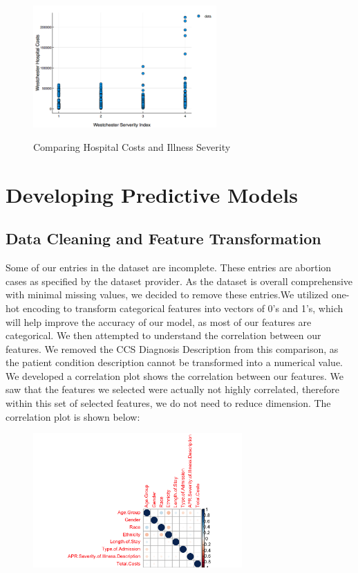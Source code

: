 \documentclass{article}
\begin{document}
\begin{figure}[h]
\centering
  \includegraphics[width=7cm]{newplot.png}
  \label{fig:boat1}
  \caption{Comparing Hospital Costs and Illness Severity}
\end{figure}

\section{Developing Predictive Models}

\subsection{Data Cleaning and Feature Transformation}
Some of our entries in the dataset are incomplete. These entries are abortion cases as specified by the dataset provider. As the dataset is overall comprehensive with minimal missing values, we decided to remove these entries.We utilized one-hot encoding to transform categorical features into vectors of 0's and 1's, which will help improve the accuracy of our model, as most of our features are categorical.\newline \newline
We then attempted to understand the correlation between our features. We removed the CCS Diagnosis Description from this comparison, as the patient condition description cannot be transformed into a numerical value. We developed a correlation plot shows the correlation between our features. We saw that the features we selected were actually not highly correlated, therefore within this set of selected features, we do not need to reduce dimension. The correlation plot is shown below:

\begin{figure}[h]
\centering
  \includegraphics[width=8cm]{Rplot.png}
  \label{fig:boat1}
\end{figure}
\end{document}
